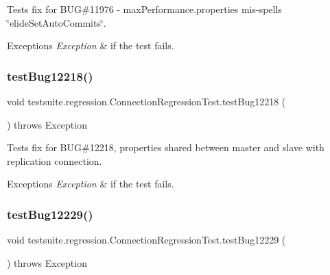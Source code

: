 Tests fix for B\+UG\#11976 -\/ max\+Performance.\+properties mis-\/spells \char`\"{}elide\+Set\+Auto\+Commits\char`\"{}.


\begin{DoxyExceptions}{Exceptions}
{\em Exception} & if the test fails. \\
\hline
\end{DoxyExceptions}
\mbox{\label{classtestsuite_1_1regression_1_1_connection_regression_test_add3171d1526d38f6597d2bd384d44cf0}} 
\subsubsection{\texorpdfstring{test\+Bug12218()}{testBug12218()}}
{\footnotesize\ttfamily void testsuite.\+regression.\+Connection\+Regression\+Test.\+test\+Bug12218 (\begin{DoxyParamCaption}{ }\end{DoxyParamCaption}) throws Exception}

Tests fix for B\+UG\#12218, properties shared between master and slave with replication connection.


\begin{DoxyExceptions}{Exceptions}
{\em Exception} & if the test fails. \\
\hline
\end{DoxyExceptions}
\mbox{\label{classtestsuite_1_1regression_1_1_connection_regression_test_ae7bb792ec6285364876e5c6c1fe03c9e}} 
\subsubsection{\texorpdfstring{test\+Bug12229()}{testBug12229()}}
{\footnotesize\ttfamily void testsuite.\+regression.\+Connection\+Regression\+Test.\+test\+Bug12229 (\begin{DoxyParamCaption}{ }\end{DoxyParamCaption}) throws Exception}

